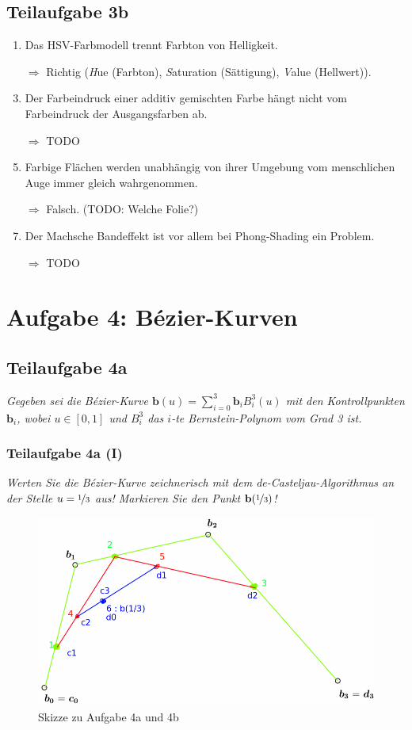 \documentclass[a4paper]{scrartcl}
\begin{document}
\subsection*{Teilaufgabe 3b}
\begin{enumerate}
    \item Das HSV-Farbmodell trennt Farbton von Helligkeit.
    \item[$\Rightarrow$] Richtig (\textit{H}ue (Farbton), \textit{S}aturation (Sättigung),
                         \textit{V}alue (Hellwert)).
    \item Der Farbeindruck einer additiv gemischten Farbe hängt nicht vom Farbeindruck der Ausgangsfarben ab.
    \item[$\Rightarrow$] TODO
    \item Farbige Flächen werden unabhängig von ihrer Umgebung vom menschlichen Auge immer gleich wahrgenommen.
    \item[$\Rightarrow$] Falsch. (TODO: Welche Folie?)
    \item Der Machsche Bandeffekt ist vor allem bei Phong-Shading ein Problem.
    \item[$\Rightarrow$] TODO
\end{enumerate}

\clearpage
\section*{Aufgabe 4: Bézier-Kurven}
\subsection*{Teilaufgabe 4a}
\textit{Gegeben sei die Bézier-Kurve $\mathbf{b}(u) = \sum_{i=0}^3 \mathbf{b}_i B_i^3(u)$ mit den Kontrollpunkten $\mathbf{b}_i$, wobei
$u \in [0, 1]$ und $B_i^3$ das $i$-te Bernstein-Polynom vom Grad 3 ist.}

\subsubsection*{Teilaufgabe 4a (I)}
\textit{Werten Sie die Bézier-Kurve zeichnerisch mit dem de-Casteljau-Algorithmus
an der Stelle $u = \nicefrac{1}{3}$ aus! Markieren Sie den Punkt $\mathbf{b}(\nicefrac{1}{3})$!}

\begin{figure}[h]
    \centering
    \includegraphics*[width=0.8\linewidth, keepaspectratio]{4ab.png}
    \caption{Skizze zu Aufgabe 4a und 4b}
    \label{fig:4ab}
\end{figure}
\end{document}
